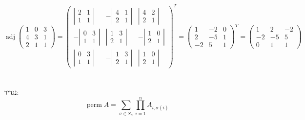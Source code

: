 \documentclass[]{article}
\DeclareMathOperator{\adj}    {adj}
\newcommand\pms[1]    {\begin{pmatrix}
        #1
\end{pmatrix}}
\newcommand\detms[1]    {\sof{\begin{matrix}
            #1
\end{matrix}}}
\newcommand\sg        {\sigma}
\newcommand\sof[1]    {\left | #1 \right |}
\theoremstyle{definition}
\DeclareMathOperator{\perm}{perm}
\begin{document}
    \section{}
    \[ \adj \pms{1 & 0  & 3 \\ 4 & 3 & 1 \\ 2 & 1 & 1} = \pms{\detms{2 & 1 \\ 1 & 1} & -\detms{4 & 1 \\ 2 & 1} & \detms{4 & 2 \\ 2 & 1} \\ -\detms{0 & 3 \\ 1 & 1} & \detms{1 & 3 \\ 2 & 1} & -\detms{1 & 0 \\ 2 & 1} \\ \detms{0 & 3 \\ 1 & 1} & -\detms{1 & 3 \\ 2 &1} & \detms{1 & 0 \\ 2 & 1}}^T = \pms{1 & -2 & 0 \\ 2 & -5 & 1 \\ -2 & 5 & 1}^T = \pms{1 & 2 & -2 \\ -2 & -5 & 5 \\ 0 & 1 & 1} \]
    \section{}
    נגדיר: 
    \[ \perm A = \sum_{\sg \in S_n}\prod_{i = 1}^{n}A_{i, \sg(i)} \]
    
\end{document}
